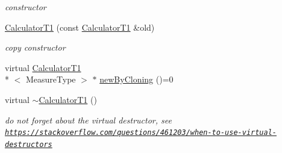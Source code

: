 \begin{DoxyCompactItemize}
\begin{DoxyCompactList}\small\item\em constructor \end{DoxyCompactList}\item 
\hypertarget{class_ox_1_1_calculator_t1_a125d297d484d10d33b8cbe796b7a60c8}{\hyperlink{class_ox_1_1_calculator_t1_a125d297d484d10d33b8cbe796b7a60c8}{Calculator\-T1} (const \hyperlink{class_ox_1_1_calculator_t1}{Calculator\-T1} \&old)}\label{class_ox_1_1_calculator_t1_a125d297d484d10d33b8cbe796b7a60c8}

\begin{DoxyCompactList}\small\item\em copy constructor \end{DoxyCompactList}\item 
virtual \hyperlink{class_ox_1_1_calculator_t1}{Calculator\-T1}\\*
$<$ Measure\-Type $>$ $\ast$ \hyperlink{class_ox_1_1_calculator_t1_a0db8102b4dad27368667e6ec89c6e4f3}{new\-By\-Cloning} ()=0
\item 
\hypertarget{class_ox_1_1_calculator_t1_af5d360f92d3c1b1c2f4241e528451f2e}{virtual \hyperlink{class_ox_1_1_calculator_t1_af5d360f92d3c1b1c2f4241e528451f2e}{$\sim$\-Calculator\-T1} ()}\label{class_ox_1_1_calculator_t1_af5d360f92d3c1b1c2f4241e528451f2e}

\begin{DoxyCompactList}\small\item\em do not forget about the virtual destructor, see \href{https://stackoverflow.com/questions/461203/when-to-use-virtual-destructors}{\tt https\-://stackoverflow.\-com/questions/461203/when-\/to-\/use-\/virtual-\/destructors} \end{DoxyCompactList}\end{DoxyCompactItemize}
